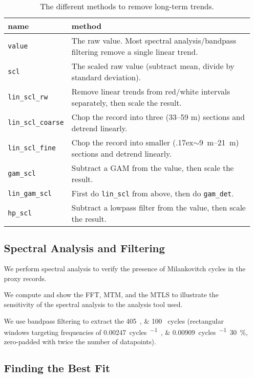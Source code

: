 \documentclass[draft]{agujournal2019}
\newcommand{\appr}{\raise.17ex\hbox{$\scriptstyle\sim$}} %
\begin{document}
\begin{table}[htbp]
\caption{\label{tab:detrend_types}The different methods to remove long-term trends.}
\centering
\begin{tabular}{ll}
  name & method\\
  \hline
  \texttt{value} & The raw value. Most spectral analysis/bandpass filtering remove a single linear trend.\\
  \texttt{scl} & The scaled raw value (subtract mean, divide by standard deviation). \\
  \texttt{lin\_scl\_rw} & Remove linear trends from red/white intervals separately, then scale the result.\\ %
  \texttt{lin\_scl\_coarse} & Chop the record into three (33--59 m) sections and detrend linearly.\\
  \texttt{lin\_scl\_fine} & Chop the record into smaller (\appr\qtyrange{9}{21}{\metre}) sections and detrend linearly.\\
  \texttt{gam\_scl} & Subtract a \gls{GAM} from the value, then scale the result.\\
  \texttt{lin\_gam\_scl} & First do \texttt{lin\_scl} from above, then do \texttt{gam\_det}.\\ %
  \texttt{hp\_scl} & Subtract a lowpass filter from the value, then scale the result.\\
\end{tabular}
\end{table}

\subsection{Spectral Analysis and Filtering}\label{sec:spectral}

We perform spectral analysis to verify the presence of Milankovitch cycles in the proxy records.

We compute and show the \gls{FFT}, %
\gls{MTM}, and the \gls{MTLS} to illustrate the sensitivity of the spectral analysis to the analysis tool used.

We use bandpass filtering to extract the \qtylist{405;100}{\kiloyear} cycles (rectangular windows targeting frequencies of \qtylist{0.00247;0.00909}{cycles\per\kilo\year}\textpm\qty{30}{\percent}, zero-padded with twice the number of datapoints).


\subsection{Finding the Best Fit}\label{sec:algorithm}
\end{document}
